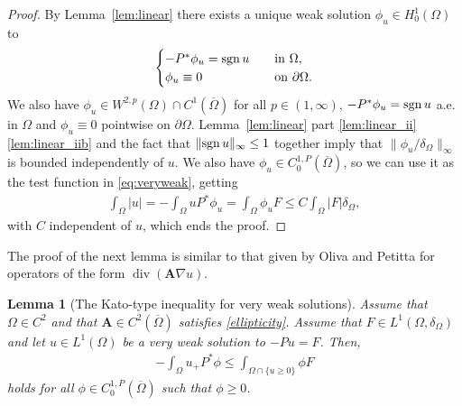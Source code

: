 \documentclass[12pt,a4paper]{amsart}
\newtheorem{lemma}[theorem]{\bf Lemma}
\theoremstyle{definition}
\newcommand{\sgn}{{\rm sgn}\,}
\newcommand{\A}{\mathbf{A}}
\newcommand*\Div{\operatorname{div}}
\begin{document}
\begin{proof}
      By Lemma~\ref{lem:linear} there exists a unique weak solution $\phi_u\in H^1_0(\Omega)$ to 
    \begin{align*}
        \begin{cases}
            -P^* \phi_u = \sgn u\quad &{\rm in}\ \Omega,\\
            \phi_u \equiv 0\quad &{\rm on}\ \partial \Omega.
        \end{cases}
    \end{align*}
    We also have $\phi_u\in W^{2,p}(\Omega)\cap C^1(\overline{\Omega})$ for all $p\in (1,\infty)$, $-P^\ast \phi_u = \sgn u$ a.e. in $\Omega$ and $\phi_u\equiv 0$ pointwise on $\partial \Omega$.  Lemma~\ref{lem:linear} part \ref{lem:linear_ii} \ref{lem:linear_iib} and the fact that $\|\sgn u\|_\infty \leq 1$ together imply that $\|\phi_u/\delta_\Omega\|_\infty$ is bounded independently of $u$. We also have $\phi_u\in C^{1,P}_0(\overline{\Omega})$, so we can use it as the test function in \eqref{eq:veryweak}, getting
    \begin{align*}
        \int_{\Omega} |u| = -\int_\Omega u P^* \phi_u =\int_\Omega \phi_u F \leq C\int_\Omega |F| \delta_\Omega,
    \end{align*}
    with $C$ independent of $u$, which ends the proof.
\end{proof}

The proof of the next lemma is similar to that given by Oliva and Petitta \cite[Lemma~2.9]{OLIVA} for operators of the form $\Div (\A \nabla u)$.

\begin{lemma}[The Kato-type inequality for very weak solutions]\label{lem:Kato}
    Assume that $\Omega \in C^{2}$ and that $\A\in C^{2}(\overline{\Omega})$ satisfies \eqref{ellipticity}. Assume that $F\in L^1(\Omega,\delta_\Omega)$ and let $u\in L^1(\Omega)$ be a very weak solution to $-Pu = F$. Then,
    \begin{align*}
        -\int_\Omega u_+ P^*\phi \leq \int_{\Omega\cap\{u\geq 0\}} \phi F
    \end{align*}
    holds for all $\phi\in C^{1,P}_0(\overline{\Omega})$ such that $\phi\geq 0$.
\end{lemma}
\end{document}
